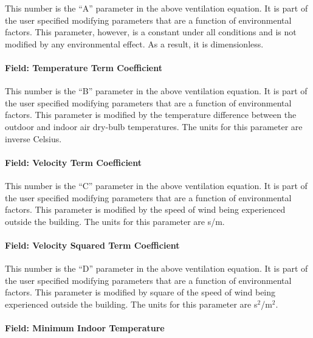 This number is the ``A'' parameter in the above ventilation equation. It is part of the user specified modifying parameters that are a function of environmental factors. This parameter, however, is a constant under all conditions and is not modified by any environmental effect. As a result, it is dimensionless.

\paragraph{Field: Temperature Term Coefficient}\label{field-temperature-term-coefficient-1}

This number is the ``B'' parameter in the above ventilation equation. It is part of the user specified modifying parameters that are a function of environmental factors. This parameter is modified by the temperature difference between the outdoor and indoor air dry-bulb temperatures. The units for this parameter are inverse Celsius.

\paragraph{Field: Velocity Term Coefficient}\label{field-velocity-term-coefficient-1}

This number is the ``C'' parameter in the above ventilation equation. It is part of the user specified modifying parameters that are a function of environmental factors. This parameter is modified by the speed of wind being experienced outside the building. The units for this parameter are s/m.

\paragraph{Field: Velocity Squared Term Coefficient}\label{field-velocity-squared-term-coefficient-1}

This number is the ``D'' parameter in the above ventilation equation. It is part of the user specified modifying parameters that are a function of environmental factors. This parameter is modified by square of the speed of wind being experienced outside the building. The units for this parameter are s\(^{2}\)/m\(^{2}\).

\paragraph{Field: Minimum Indoor Temperature}\label{field-minimum-indoor-temperature}

